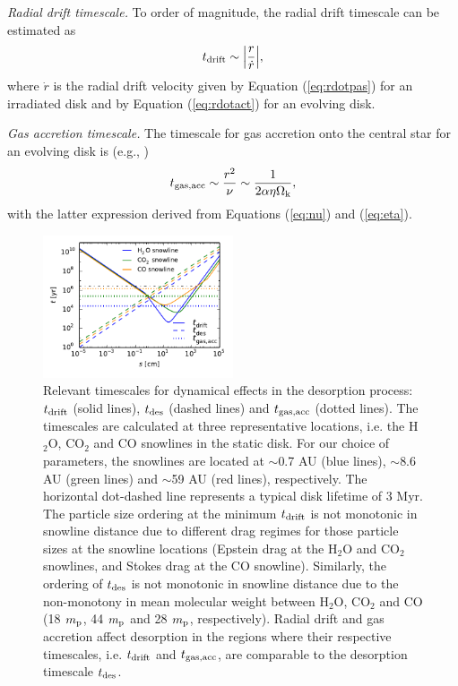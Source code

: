 \documentclass[apj]{emulateapj}
\begin{document}
\textit{Radial drift timescale.} To order of magnitude, the radial drift timescale can be estimated as 
\begin{equation}
\label{eq:tdrift}
t_{\rm drift} \sim \Big|\frac{r}{\dot{r}}\Big|,
\end{equation}
where $\dot{r}$ is the radial drift velocity given by Equation (\ref{eq:rdotpas}) for an irradiated disk and by Equation (\ref{eq:rdotact}) for an evolving disk.

\textit{Gas accretion timescale.} The timescale for gas accretion onto the central star for an evolving disk is (e.g., \citealt{armitage10})
\begin{equation}
\label{eq:tgas}
t_{\rm gas, acc} \sim \frac{r^2}{\nu} \sim \frac{1}{2 \alpha \eta \Omega_{\rm k}},
\end{equation}
with the latter expression derived from Equations (\ref{eq:nu}) and (\ref{eq:eta}).

\begin{figure}[h!]
\centering
\includegraphics[width=0.5\textwidth]{drift_timescales_betaS1_gas_acc_new2.pdf}
\caption{Relevant timescales for dynamical effects in the desorption process: $t_{\rm drift}$ (solid lines), $t_{\rm des}$ (dashed lines) and $t_{\rm gas, acc}$ (dotted lines). The timescales are calculated at three representative locations, i.e. the H$_2$O, CO$_2$ and CO snowlines in the static disk. For our choice of parameters, the snowlines are located at $\sim$0.7 AU (blue lines), $\sim$8.6 AU (green lines) and $\sim$59 AU (red lines), respectively. The horizontal dot-dashed line represents a typical disk lifetime of 3 Myr. The particle size ordering at the minimum $t_{\rm drift}$ is not monotonic in snowline distance due to different drag regimes for those particle sizes at the snowline locations (Epstein drag at the H$_2$O and CO$_2$ snowlines, and Stokes drag at the CO snowline). Similarly, the ordering of $t_{\rm des}$ is not monotonic in snowline distance due to the non-monotony in mean molecular weight between H$_2$O, CO$_2$ and CO (18 $m_{\rm p}$, 44 $m_{\rm p}$ and 28 $m_{\rm p}$, respectively). Radial drift and gas accretion affect desorption in the regions where their respective timescales, i.e. $t_{\rm drift}$ and $t_{\rm gas, acc}$, are comparable to the desorption timescale $t_{\rm des}$.} 
\label{fig:timescales}
\end{figure}
\end{document}
